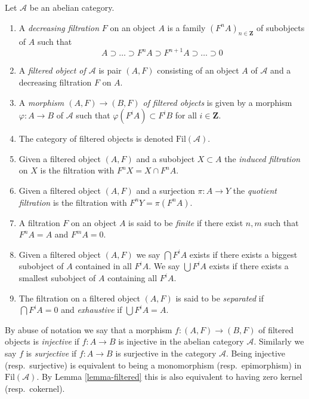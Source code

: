 \begin{definition}
\label{definition-filtered}
Let $\mathcal{A}$ be an abelian category.
\begin{enumerate}
\item A {\it decreasing filtration} $F$ on an object $A$
is a family $(F^nA)_{n \in \mathbf{Z}}$ of subobjects of $A$ such that
$$
A \supset \ldots \supset F^nA \supset F^{n + 1}A \supset \ldots \supset 0
$$
\item A {\it filtered object of $\mathcal{A}$} is
pair $(A, F)$ consisting of an object $A$ of $\mathcal{A}$
and a decreasing filtration $F$ on $A$.
\item A {\it morphism $(A, F) \to (B, F)$ of filtered objects}
is given by a morphism $\varphi : A \to B$ of $\mathcal{A}$
such that $\varphi(F^iA) \subset F^iB$ for all $i \in \mathbf{Z}$.
\item The category of filtered objects is denoted $\text{Fil}(\mathcal{A})$.
\item Given a filtered object $(A, F)$ and a subobject $X \subset A$ the
{\it induced filtration} on $X$ is the filtration with $F^nX = X \cap F^nA$.
\item Given a filtered object $(A, F)$ and a surjection
$\pi : A \to Y$ the {\it quotient filtration} is the filtration with
$F^nY = \pi(F^nA)$.
\item A filtration $F$ on an object $A$ is said to be {\it finite}
if there exist $n, m$ such that $F^nA = A$ and $F^mA = 0$.
\item Given a filtered object $(A, F)$ we say $\bigcap F^iA$ exists
if there exists a biggest subobject of $A$ contained in all $F^iA$.
We say $\bigcup F^iA$ exists if there exists a smallest subobject
of $A$ containing all $F^iA$.
\item The filtration on a filtered object $(A, F)$ is said to be
{\it separated} if $\bigcap F^iA = 0$ and
{\it exhaustive} if $\bigcup F^iA = A$.
\end{enumerate}
\end{definition}

\noindent
By abuse of notation we say that a morphism $f : (A, F) \to (B, F)$
of filtered objects is {\it injective} if $f : A \to B$ is injective
in the abelian category $\mathcal{A}$. Similarly we say $f$ is
{\it surjective} if $f : A \to B$ is surjective in the category
$\mathcal{A}$. Being injective (resp.\ surjective)
is equivalent to being a monomorphism (resp.\ epimorphism)
in $\text{Fil}(\mathcal{A})$. By
Lemma \ref{lemma-filtered}
this is also equivalent to having zero kernel (resp.\ cokernel).

